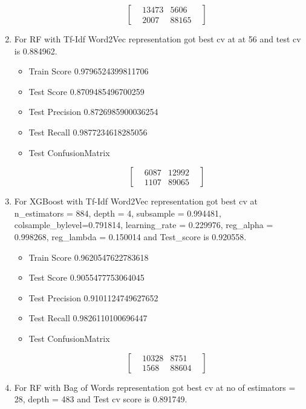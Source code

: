 \documentclass[11pt]{article}
\providecommand{\tightlist}{%
      \setlength{\itemsep}{0pt}\setlength{\parskip}{0pt}}
\begin{document}
\begin{enumerate}
\begin{itemize}
    \begin{equation}
    \begin{bmatrix}
    & 13473 & 5606 &  \\
    & 2007 & 88165 & 
    \end{bmatrix}
    \end{equation}
  \end{itemize}
\item
  For RF with Tf-Idf Word2Vec representation got best cv at at 56 and
  test cv is 0.884962.

  \begin{itemize}
  \tightlist
  \item
    Train Score 0.9796524399811706
  \item
    Test Score 0.8709485496700259
  \item
    Test Precision 0.8726985900036254
  \item
    Test Recall 0.9877234618285056
  \item
    Test ConfusionMatrix

    \begin{equation}
    \begin{bmatrix}
    & 6087 & 12992 &  \\
    & 1107 & 89065 & 
    \end{bmatrix}
    \end{equation}
  \end{itemize}
\item
  For XGBoost with Tf-Idf Word2Vec representation got best cv at
  n\_estimators = 884, depth = 4, subsample = 0.994481,
  colsample\_bylevel=0.791814, learning\_rate = 0.229976, reg\_alpha =
  0.998268, reg\_lambda = 0.150014 and Test\_score is 0.920558.

  \begin{itemize}
  \tightlist
  \item
    Train Score 0.9620547622783618
  \item
    Test Score 0.9055477753064045
  \item
    Test Precision 0.9101124749627652
  \item
    Test Recall 0.9826110100696447
  \item
    Test ConfusionMatrix

    \begin{equation}
    \begin{bmatrix}
    & 10328 & 8751 &  \\
    & 1568 & 88604 & 
    \end{bmatrix}
    \end{equation}
  \end{itemize}
\item
  For RF with Bag of Words representation got best cv at no of
  estimators = 28, depth = 483 and Test cv score is 0.891749.


\end{enumerate}
\end{document}
